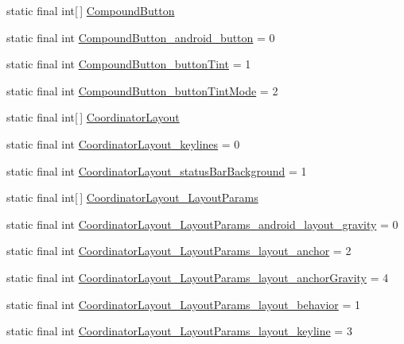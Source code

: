 \begin{DoxyCompactItemize}
\item 
static final int\mbox{[}$\,$\mbox{]} \hyperlink{classcheck_1_1test_1_1_r_1_1styleable_a92450249dab865f0e8cb180e69be8dcf}{Compound\+Button}
\item 
static final int \hyperlink{classcheck_1_1test_1_1_r_1_1styleable_ae01e886272fd023e7246e70fe1b9f02a}{Compound\+Button\+\_\+android\+\_\+button} = 0
\item 
static final int \hyperlink{classcheck_1_1test_1_1_r_1_1styleable_abeac4e31561aff11337ba066d51e4a89}{Compound\+Button\+\_\+button\+Tint} = 1
\item 
static final int \hyperlink{classcheck_1_1test_1_1_r_1_1styleable_a0c860185874a6d4eb945c0ff3ab04d68}{Compound\+Button\+\_\+button\+Tint\+Mode} = 2
\item 
static final int\mbox{[}$\,$\mbox{]} \hyperlink{classcheck_1_1test_1_1_r_1_1styleable_af5f8b747fab6f8b93989f42f927f00fc}{Coordinator\+Layout}
\item 
static final int \hyperlink{classcheck_1_1test_1_1_r_1_1styleable_ace4f3ed32729fc65e4cdaae8db4dc51e}{Coordinator\+Layout\+\_\+keylines} = 0
\item 
static final int \hyperlink{classcheck_1_1test_1_1_r_1_1styleable_ad1fdf005500041f1c7352b0934313c58}{Coordinator\+Layout\+\_\+status\+Bar\+Background} = 1
\item 
static final int\mbox{[}$\,$\mbox{]} \hyperlink{classcheck_1_1test_1_1_r_1_1styleable_a9873c4709aad91a176af799873edc422}{Coordinator\+Layout\+\_\+\+Layout\+Params}
\item 
static final int \hyperlink{classcheck_1_1test_1_1_r_1_1styleable_a0b7c3eda13b614a196a08848298a893f}{Coordinator\+Layout\+\_\+\+Layout\+Params\+\_\+android\+\_\+layout\+\_\+gravity} = 0
\item 
static final int \hyperlink{classcheck_1_1test_1_1_r_1_1styleable_a8e01daeccfb5aa2fea37a64ec5b7fb3f}{Coordinator\+Layout\+\_\+\+Layout\+Params\+\_\+layout\+\_\+anchor} = 2
\item 
static final int \hyperlink{classcheck_1_1test_1_1_r_1_1styleable_a5b244cd9e2a37484e7cf43272ca1e0f7}{Coordinator\+Layout\+\_\+\+Layout\+Params\+\_\+layout\+\_\+anchor\+Gravity} = 4
\item 
static final int \hyperlink{classcheck_1_1test_1_1_r_1_1styleable_ae9db473c28ded0bb6dcf42e3c26445a1}{Coordinator\+Layout\+\_\+\+Layout\+Params\+\_\+layout\+\_\+behavior} = 1
\item 
static final int \hyperlink{classcheck_1_1test_1_1_r_1_1styleable_a4dd7ccd864a6f3ecf1b6734fb54a58ff}{Coordinator\+Layout\+\_\+\+Layout\+Params\+\_\+layout\+\_\+keyline} = 3

\end{DoxyCompactItemize}
